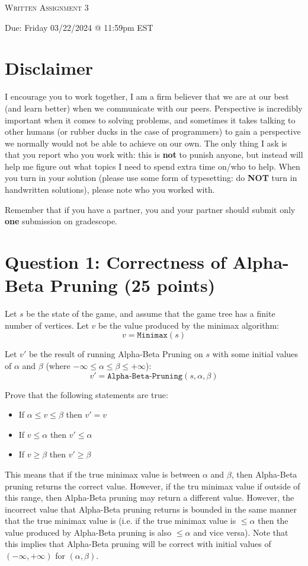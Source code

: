 \documentclass[11pt]{article}
\newcommand{\question}[1]{\section*{\normalsize #1}}
\begin{document}
\begin{center}
    {\Large \textsc{Written Assignment 3}}
\end{center}
\begin{center}
    Due: Friday 03/22/2024 @ 11:59pm EST
\end{center}

\section*{\textbf{Disclaimer}}
I encourage you to work together, I am a firm believer that we are at our best (and learn better) when we communicate with our peers. Perspective is incredibly important when it comes to solving problems, and sometimes it takes talking to other humans (or rubber ducks in the case of programmers) to gain a perspective we normally would not be able to achieve on our own. The only thing I ask is that you report who you work with: this is \textbf{not} to punish anyone, but instead will help me figure out what topics I need to spend extra time on/who to help. When you turn in your solution (please use some form of typesetting: do \textbf{NOT} turn in handwritten solutions), please note who you worked with.\newline

\noindent Remember that if you have a partner, you and your partner should submit only \textbf{one} submission on gradescope.



\question{Question 1: Correctness of Alpha-Beta Pruning (25 points)}
Let $s$ be the state of the game, and assume that the game tree has a finite number of vertices. Let $v$ be the value produced by the minimax algorithm:
$$v = \texttt{Minimax}(s)$$

\noindent Let $v'$ be the result of running Alpha-Beta Pruning on $s$ with some initial values of $\alpha$ and $\beta$ (where $-\infty\le \alpha\le\beta\le+\infty$):
$$v' = \texttt{Alpha-Beta-Pruning}(s, \alpha, \beta)$$

\noindent Prove that the following statements are true:
\begin{itemize}
    \item If $\alpha \le v \le \beta$ then $v' = v$
    \item If $v\le \alpha$ then $v'\le \alpha$
    \item If $v \ge \beta$ then $v'\ge \beta$
\end{itemize}

\noindent This means that if the true minimax value is between $\alpha$ and $\beta$, then Alpha-Beta pruning returns the correct value. However, if the tru minimax value if outside of this range, then Alpha-Beta pruning may return a different value. However, the incorrect value that Alpha-Beta pruning returns is bounded in the same manner that the true minimax value is (i.e. if the true minimax value is $\le \alpha$ then the value produced by Alpha-Beta pruning is also $\le \alpha$ and vice versa). Note that this implies that Alpha-Beta pruning will be correct with initial values of $(-\infty, +\infty)$ for $(\alpha, \beta)$.\newline\newline
\end{document}
